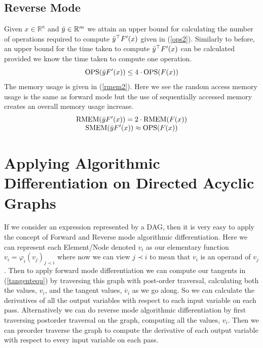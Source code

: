 \documentclass{article}
\begin{document}
\subsection{Reverse Mode}

Given $x \in \mathbb{R}^n$ and $\Bar{y} \in \mathbb{R}^m$ we attain an upper bound for calculating the number of operations required to compute $\Bar{y}^\top F'(x)$ given in (\ref{ops2}). Similarly to before, an upper bound for the time taken to compute $\Bar{y}^\top F'(x)$ can be calculated provided we know the time taken to compute one operation.
\begin{equation} \label{ops2}
    \text{OPS}(\Bar{y} F'(x)) \leq 4 \cdot \text{OPS}(F(x))
\end{equation}
The memory usage is given in (\ref{rmem2}). Here we see the random access memory usage is the same as forward mode but the use of sequentially accessed memory creates an overall memory usage increase.
\begin{equation} \label{rmem2}
    \begin{tabular}{c}
        $\text{RMEM}(\Bar{y} F'(x)) = 2 \cdot \text{RMEM}(F(x))$ \\ 
        $\text{SMEM}(\Bar{y} F'(x)) \approx \text{OPS}(F(x))$
    \end{tabular}
\end{equation}

\section{Applying Algorithmic Differentiation on Directed Acyclic Graphs}

If we consider an expression represented by a DAG, then it is very easy to apply the concept of Forward and Reverse mode algorithmic differentiation. Here we can represent each Element/Node denoted $v_i$ as our elementary function $v_i = \varphi_i (v_j)_{j \prec i}$ where now we can view $j \prec i$ to mean that $v_i$ is an operand of $v_j$. Then to apply forward mode differentiation we can compute our tangents in (\ref{tangentequ}) by traversing this graph with post-order traversal, calculating both the values, $v_i$, and the tangent values, $\Dot{v_i}$ as we go along. So we can calculate the derivatives of all the output variables with respect to each input variable on each pass. Alternatively we can do reverse mode algorithmic differentiation by first traversing postorder traversal on the graph, computing all the values, $v_i$. Then we can preorder traverse the graph to compute the derivative of each output variable with respect to every input variable on each pass.
\end{document}

